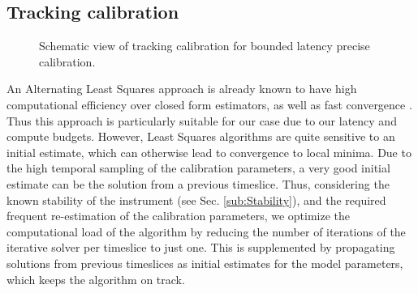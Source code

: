 \documentclass{aa}
\begin{document}
\subsection{Tracking calibration}

\begin{figure}[tbh]

\caption{\label{fig:trackcalSchematic}Schematic view of tracking calibration
for bounded latency precise calibration.}
\end{figure}

An  Alternating   Least  Squares  approach   is  already  known  to   have  high
computational  efficiency   over  closed  form  estimators,  as   well  as  fast
convergence  \citep{boonstra2003gain}.   Thus   this  approach  is  particularly
suitable for  our case due to  our latency and compute  budgets.  However, Least
Squares  algorithms  are quite  sensitive  to  an  initial estimate,  which  can
otherwise lead to convergence to local minima. Due to the high temporal sampling
of the calibration parameters, a very  good initial estimate can be the solution
from  a  previous timeslice.   Thus,  considering  the  known stability  of  the
instrument   (see  Sec.    \ref{sub:Stability}),  and   the   required  frequent
re-estimation of the calibration  parameters, we optimize the computational load
of the  algorithm by reducing the  number of iterations of  the iterative solver
per timeslice  to just one. This  is supplemented by  propagating solutions from
previous timeslices as  initial estimates for the model  parameters, which keeps
the  algorithm on  track. 
\end{document}
